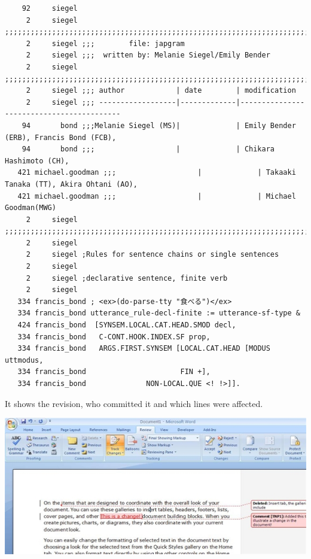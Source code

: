 \documentclass[a4paper,landscape,headrule,footrule,xetex]{foils}
\begin{document}
\begin{tiny}
\begin{verbatim}
    92     siegel 
     2     siegel ;;;;;;;;;;;;;;;;;;;;;;;;;;;;;;;;;;;;;;;;;;;;;;;;;;;;;;;;;;;;;;;;;;;;;;;;;;;;;;;
     2     siegel ;;;        file: japgram
     2     siegel ;;;  written by: Melanie Siegel/Emily Bender
     2     siegel ;;;;;;;;;;;;;;;;;;;;;;;;;;;;;;;;;;;;;;;;;;;;;;;;;;;;;;;;;;;;;;;;;;;;;;;;;;;;;;;
     2     siegel ;;; author            | date        | modification
     2     siegel ;;; ------------------|-------------|------------------------------------------
    94       bond ;;;Melanie Siegel (MS)|             | Emily Bender (ERB), Francis Bond (FCB), 
    94       bond ;;;                   |             | Chikara Hashimoto (CH),  
   421 michael.goodman ;;;                   |             | Takaaki Tanaka (TT), Akira Ohtani (AO),
   421 michael.goodman ;;;                   |             | Michael Goodman(MWG)
     2     siegel ;;;;;;;;;;;;;;;;;;;;;;;;;;;;;;;;;;;;;;;;;;;;;;;;;;;;;;;;;;;;;;;;;;;;;;;;;;;;;;;
     2     siegel 
     2     siegel ;Rules for sentence chains or single sentences
     2     siegel 
     2     siegel ;declarative sentence, finite verb
     2     siegel 
   334 francis_bond ; <ex>(do-parse-tty "食べる")</ex>
   334 francis_bond utterance_rule-decl-finite := utterance-sf-type &
   424 francis_bond  [SYNSEM.LOCAL.CAT.HEAD.SMOD decl, 
   334 francis_bond   C-CONT.HOOK.INDEX.SF prop,
   334 francis_bond   ARGS.FIRST.SYNSEM [LOCAL.CAT.HEAD [MODUS uttmodus, 
   334 francis_bond 				     FIN +],
   334 francis_bond 		     NON-LOCAL.QUE <! !>]]. 

\end{verbatim}
\end{tiny}

It shows the revision, who committed it and which lines were affected.


\MyLogo{}
\begin{center}
  \includegraphics[width=\textwidth]{../pics/word-track-changes}
\end{center}
\end{document}
